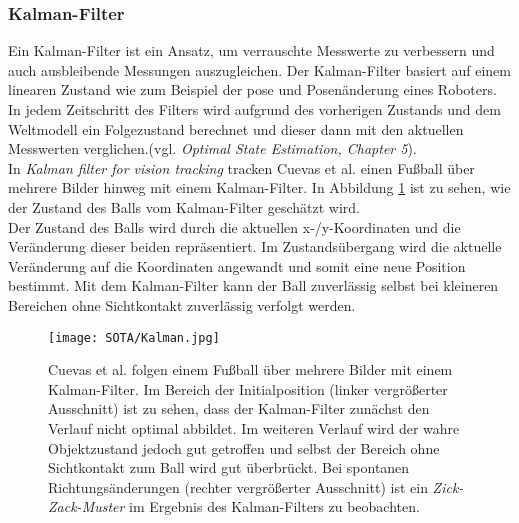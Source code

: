 \subsubsection{Kalman-Filter}
Ein Kalman-Filter ist ein Ansatz, um verrauschte Messwerte zu verbessern und auch ausbleibende Messungen auszugleichen. Der Kalman-Filter basiert auf einem linearen Zustand wie zum Beispiel der \gls{pose} und Posenänderung eines Roboters. In jedem Zeitschritt des Filters wird aufgrund des vorherigen Zustands und dem Weltmodell ein Folgezustand berechnet und dieser dann mit den aktuellen Messwerten verglichen.(vgl. \textit{Optimal State Estimation, Chapter 5}\cite{simon2006optimal}).\\
In \textit{Kalman filter for vision tracking}\cite{cuevas2005kalman} tracken Cuevas et al. einen Fußball über mehrere Bilder hinweg mit einem Kalman-Filter. In Abbildung \ref{kalmanTrack} ist zu sehen, wie der Zustand des Balls vom Kalman-Filter geschätzt wird.\\
Der Zustand des Balls wird durch die aktuellen x-/y-Koordinaten und die Veränderung dieser beiden repräsentiert. Im Zustandsübergang wird die aktuelle Veränderung auf die Koordinaten angewandt und somit eine neue Position bestimmt. Mit dem Kalman-Filter kann der Ball zuverlässig selbst bei kleineren Bereichen ohne Sichtkontakt zuverlässig verfolgt werden.

\begin{figure}[H]
\centering
\texttt{[image: SOTA/Kalman.jpg]}
\caption[Objekttracking mit Kalman-Filter]{Cuevas et al.\cite{cuevas2005kalman} folgen einem Fußball über mehrere Bilder mit einem Kalman-Filter. Im Bereich der Initialposition (linker vergrößerter Ausschnitt) ist zu sehen, dass der Kalman-Filter zunächst den Verlauf nicht optimal abbildet. Im weiteren Verlauf wird der wahre Objektzustand jedoch gut getroffen und selbst der Bereich ohne Sichtkontakt zum Ball wird gut überbrückt. Bei spontanen Richtungsänderungen (rechter vergrößerter Ausschnitt) ist ein \textit{Zick-Zack-Muster} im Ergebnis des Kalman-Filters zu beobachten.}
\label{kalmanTrack}
\end{figure}

